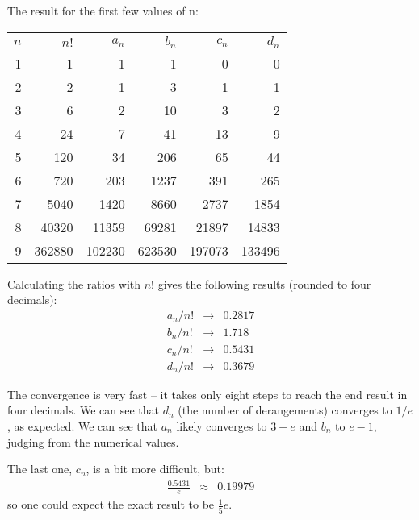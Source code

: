 \documentclass[onecolumn]{article}
\begin{document}
The result for the first few values of n:

\begin{table}[h!]
\begin{tabular}{rrrrrr}
$n$     &    $n!$     &    $a_n$    &    $b_n$    &    $c_n$ &    $d_n$    \\
\hline
 1      &      1      &      1      &      1      &      0   &      0      \\
 2      &      2      &      1      &      3      &      1   &      1      \\
 3      &      6      &      2      &     10      &      3   &      2      \\
 4      &     24      &      7      &     41      &     13   &      9      \\
 5      &    120      &     34      &    206      &     65   &     44      \\
 6      &    720      &    203      &   1237      &    391   &    265      \\
 7      &   5040      &   1420      &   8660      &   2737   &   1854      \\
 8      &  40320      &  11359      &  69281      &  21897   &  14833      \\
 9      & 362880      & 102230      & 623530      & 197073   & 133496      \\
\end{tabular}
\end{table}

Calculating the ratios with $n!$ gives the following results (rounded to four decimals):
\begin{eqnarray}
a_n / n! & \rightarrow & 0.2817  \\
b_n / n! & \rightarrow & 1.718   \\
c_n / n! & \rightarrow & 0.5431  \\
d_n / n! & \rightarrow & 0.3679
\end{eqnarray}

The convergence is very fast -- it takes only eight steps to reach the end result in four decimals.
We can see that $d_n$ (the number of derangements) converges to $1/e$, as expected. We can see that $a_n$ likely converges
to $3-e$ and $b_n$ to $e-1$, judging from the numerical values.

The last one, $c_n$, is a bit more difficult, but:
\begin{eqnarray}
\frac{0.5431}{e} & \approx & 0.19979
\end{eqnarray}
\noindent so one could expect the exact result to be $\frac{1}{5} e$.
\end{document}
